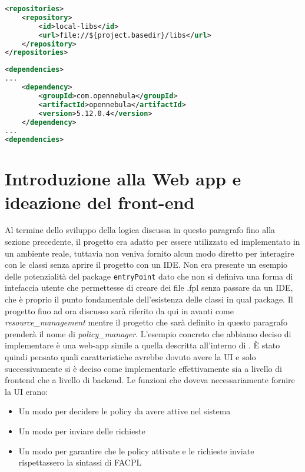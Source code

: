\begin{lstlisting}[language=XML, xleftmargin=1em, caption=Repository locale, label=code:libsxml]
<repositories>
    <repository>
        <id>local-libs</id>
        <url>file://${project.basedir}/libs</url>
    </repository>
</repositories>
\end{lstlisting}
\begin{lstlisting}[language=XML, xleftmargin=1em, caption=Dipendenza di OpenNebula, label=code:dependencyOpenNebula]
<dependencies>
...
    <dependency>
        <groupId>com.opennebula</groupId>
        <artifactId>opennebula</artifactId>
        <version>5.12.0.4</version>
    </dependency>
...
<dependencies>
\end{lstlisting}

\section{Introduzione alla Web app e ideazione del front-end}
Al termine dello sviluppo della logica discussa in questo paragrafo fino alla sezione precedente, il progetto era adatto per essere utilizzato ed implementato in un ambiente reale, tuttavia non veniva fornito alcun modo diretto per interagire con le classi senza aprire il progetto con un IDE. Non era presente un esempio delle potenzialità del package \texttt{entryPoint} dato che non si definiva una forma di intefaccia utente che permettesse di creare dei file .fpl senza passare da un IDE, che è proprio il punto fondamentale dell'esistenza delle classi in qual package.\medbreak
Il progetto fino ad ora discusso sarà riferito da qui in avanti come \emph{resource\_management} mentre il progetto che sarà definito in questo paragrafo prenderà il nome di \emph{policy\_manager}.
L'esempio concreto che abbiamo deciso di implementare è una web-app simile a quella descritta all'interno di \cite{10.1007/978-3-319-08260-8_6}. È stato quindi pensato quali caratteristiche avrebbe dovuto avere la UI e solo successivamente si è deciso come implementarle effettivamente sia a livello di frontend che a livello di backend. Le funzioni che doveva necessariamente fornire la UI erano:
\begin{itemize}
    \item Un modo per decidere le policy da avere attive nel sistema
    \item Un modo per inviare delle richieste
    \item Un modo per garantire che le policy attivate e le richieste inviate rispettassero la sintassi di FACPL
\end{itemize}
